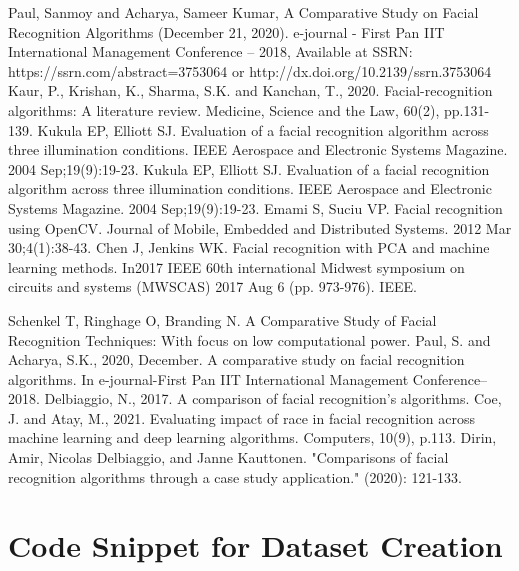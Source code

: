 \documentclass[openany]{report}
\begin{document}
\begin{thebibliography}{10}
    Paul, Sanmoy and Acharya, Sameer Kumar, A Comparative Study on Facial Recognition Algorithms (December 21, 2020). e-journal - First Pan IIT International Management Conference – 2018, Available at SSRN: https://ssrn.com/abstract=3753064 or http://dx.doi.org/10.2139/ssrn.3753064
    Kaur, P., Krishan, K., Sharma, S.K. and Kanchan, T., 2020. Facial-recognition algorithms: A literature review. Medicine, Science and the Law, 60(2), pp.131-139.
    Kukula EP, Elliott SJ. Evaluation of a facial recognition algorithm across three illumination conditions. IEEE Aerospace and Electronic Systems Magazine. 2004 Sep;19(9):19-23.
    Kukula EP, Elliott SJ. Evaluation of a facial recognition algorithm across three illumination conditions. IEEE Aerospace and Electronic Systems Magazine. 2004 Sep;19(9):19-23.
    Emami S, Suciu VP. Facial recognition using OpenCV. Journal of Mobile, Embedded and Distributed Systems. 2012 Mar 30;4(1):38-43.
    Chen J, Jenkins WK. Facial recognition with PCA and machine learning methods. In2017 IEEE 60th international Midwest symposium on circuits and systems (MWSCAS) 2017 Aug 6 (pp. 973-976). IEEE.

    Schenkel T, Ringhage O, Branding N. A Comparative Study of Facial Recognition Techniques: With focus on low computational power.
    Paul, S. and Acharya, S.K., 2020, December. A comparative study on facial recognition algorithms. In e-journal-First Pan IIT International Management Conference–2018.
    Delbiaggio, N., 2017. A comparison of facial recognition’s algorithms.
    Coe, J. and Atay, M., 2021. Evaluating impact of race in facial recognition across machine learning and deep learning algorithms. Computers, 10(9), p.113.
    Dirin, Amir, Nicolas Delbiaggio, and Janne Kauttonen. "Comparisons of facial recognition algorithms through a case study application." (2020): 121-133.

\end{thebibliography}



\appendix

\chapter{Code Snippet for Dataset Creation}
\end{document}
